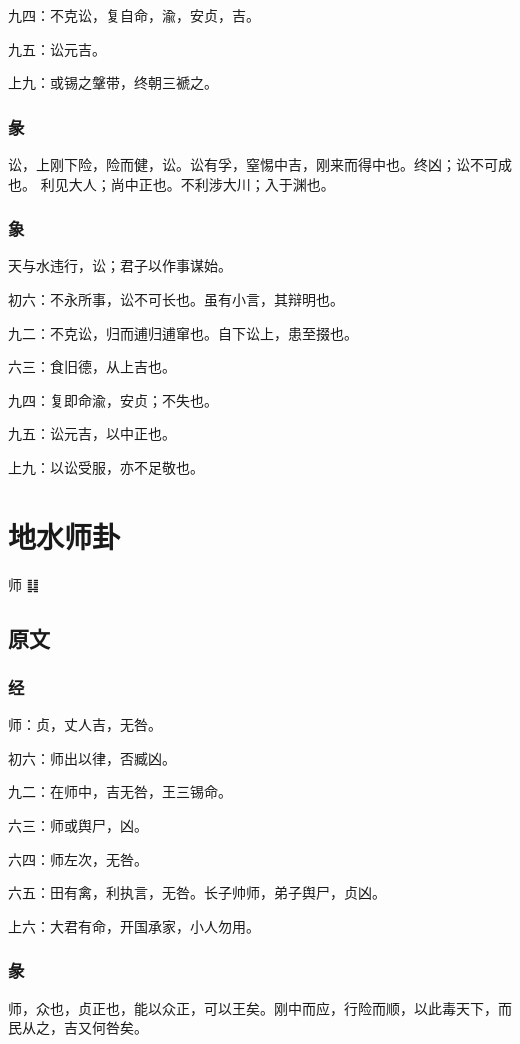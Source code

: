 \documentclass[12pt,oneside]{book}
\begin{document}
九四：不克讼，复自命，渝，安贞，吉。

九五：讼元吉。

上九：或锡之鞶带，终朝三褫之。

\subsection{彖}
讼，上刚下险，险而健，讼。讼有孚，窒惕中吉，刚来而得中也。终凶；讼不可成也。 利见大人；尚中正也。不利涉大川；入于渊也。

\subsection{象}
天与水违行，讼；君子以作事谋始。

初六：不永所事，讼不可长也。虽有小言，其辩明也。

九二：不克讼，归而逋归逋窜也。自下讼上，患至掇也。

六三：食旧德，从上吉也。

九四：复即命渝，安贞；不失也。

九五：讼元吉，以中正也。

上九：以讼受服，亦不足敬也。

\chapter{地水师卦}
师 {\Large ䷆}

\section{原文}
\subsection{经}
师：贞，丈人吉，无咎。

初六：师出以律，否臧凶。

九二：在师中，吉无咎，王三锡命。

六三：师或舆尸，凶。

六四：师左次，无咎。

六五：田有禽，利执言，无咎。长子帅师，弟子舆尸，贞凶。

上六：大君有命，开国承家，小人勿用。

\subsection{彖}
师，众也，贞正也，能以众正，可以王矣。刚中而应，行险而顺，以此毒天下，而民从之，吉又何咎矣。
\end{document}
